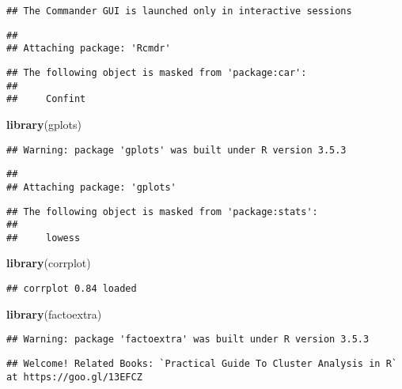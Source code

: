 \documentclass[]{article}
\newenvironment{Shaded}{\begin{snugshade}}{\end{snugshade}}
\newcommand{\KeywordTok}[1]{\textcolor[rgb]{0.13,0.29,0.53}{\textbf{#1}}}
\newcommand{\NormalTok}[1]{#1}
\begin{document}
\begin{verbatim}
## The Commander GUI is launched only in interactive sessions
\end{verbatim}

\begin{verbatim}
## 
## Attaching package: 'Rcmdr'
\end{verbatim}

\begin{verbatim}
## The following object is masked from 'package:car':
## 
##     Confint
\end{verbatim}

\begin{Shaded}
\begin{Highlighting}[]
\KeywordTok{library}\NormalTok{(gplots)}
\end{Highlighting}
\end{Shaded}

\begin{verbatim}
## Warning: package 'gplots' was built under R version 3.5.3
\end{verbatim}

\begin{verbatim}
## 
## Attaching package: 'gplots'
\end{verbatim}

\begin{verbatim}
## The following object is masked from 'package:stats':
## 
##     lowess
\end{verbatim}

\begin{Shaded}
\begin{Highlighting}[]
\KeywordTok{library}\NormalTok{(corrplot)}
\end{Highlighting}
\end{Shaded}

\begin{verbatim}
## corrplot 0.84 loaded
\end{verbatim}

\begin{Shaded}
\begin{Highlighting}[]
\KeywordTok{library}\NormalTok{(factoextra)}
\end{Highlighting}
\end{Shaded}

\begin{verbatim}
## Warning: package 'factoextra' was built under R version 3.5.3
\end{verbatim}

\begin{verbatim}
## Welcome! Related Books: `Practical Guide To Cluster Analysis in R` at https://goo.gl/13EFCZ
\end{verbatim}
\end{document}
